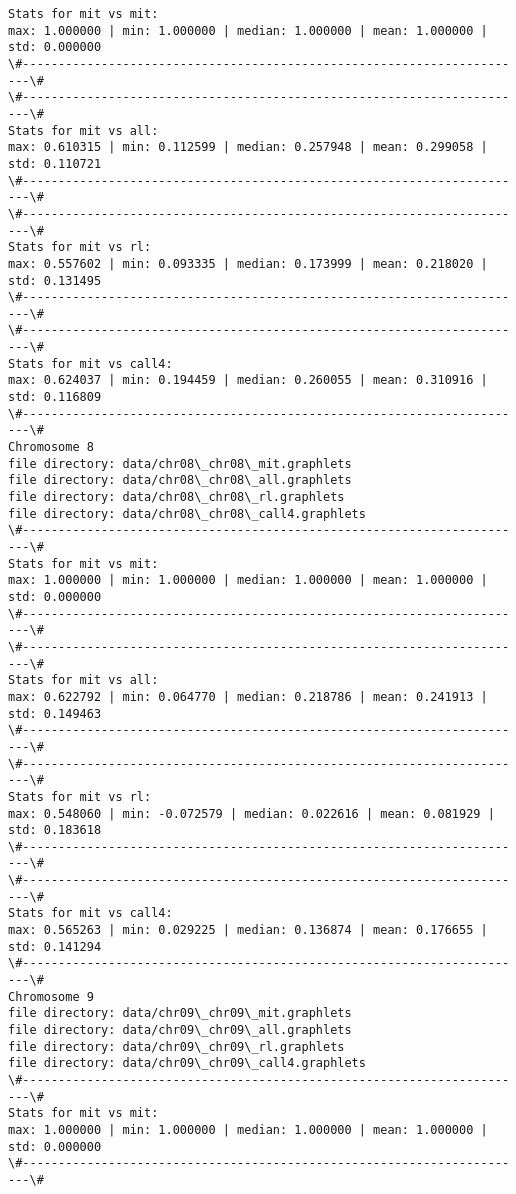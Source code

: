 \documentclass[11pt]{article}
\begin{document}
\begin{Verbatim}[commandchars=\\\{\}]
Stats for mit vs mit: 
max: 1.000000 | min: 1.000000 | median: 1.000000 | mean: 1.000000 | std: 0.000000
\#-----------------------------------------------------------------------\#
\#-----------------------------------------------------------------------\#
Stats for mit vs all: 
max: 0.610315 | min: 0.112599 | median: 0.257948 | mean: 0.299058 | std: 0.110721
\#-----------------------------------------------------------------------\#
\#-----------------------------------------------------------------------\#
Stats for mit vs rl: 
max: 0.557602 | min: 0.093335 | median: 0.173999 | mean: 0.218020 | std: 0.131495
\#-----------------------------------------------------------------------\#
\#-----------------------------------------------------------------------\#
Stats for mit vs call4: 
max: 0.624037 | min: 0.194459 | median: 0.260055 | mean: 0.310916 | std: 0.116809
\#-----------------------------------------------------------------------\#
Chromosome 8
file directory: data/chr08\_chr08\_mit.graphlets
file directory: data/chr08\_chr08\_all.graphlets
file directory: data/chr08\_chr08\_rl.graphlets
file directory: data/chr08\_chr08\_call4.graphlets
\#-----------------------------------------------------------------------\#
Stats for mit vs mit: 
max: 1.000000 | min: 1.000000 | median: 1.000000 | mean: 1.000000 | std: 0.000000
\#-----------------------------------------------------------------------\#
\#-----------------------------------------------------------------------\#
Stats for mit vs all: 
max: 0.622792 | min: 0.064770 | median: 0.218786 | mean: 0.241913 | std: 0.149463
\#-----------------------------------------------------------------------\#
\#-----------------------------------------------------------------------\#
Stats for mit vs rl: 
max: 0.548060 | min: -0.072579 | median: 0.022616 | mean: 0.081929 | std: 0.183618
\#-----------------------------------------------------------------------\#
\#-----------------------------------------------------------------------\#
Stats for mit vs call4: 
max: 0.565263 | min: 0.029225 | median: 0.136874 | mean: 0.176655 | std: 0.141294
\#-----------------------------------------------------------------------\#
Chromosome 9
file directory: data/chr09\_chr09\_mit.graphlets
file directory: data/chr09\_chr09\_all.graphlets
file directory: data/chr09\_chr09\_rl.graphlets
file directory: data/chr09\_chr09\_call4.graphlets
\#-----------------------------------------------------------------------\#
Stats for mit vs mit: 
max: 1.000000 | min: 1.000000 | median: 1.000000 | mean: 1.000000 | std: 0.000000
\#-----------------------------------------------------------------------\#

\end{Verbatim}
\end{document}
